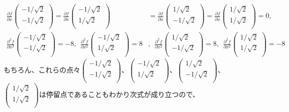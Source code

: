 \documentclass[dvipdfmx]{jsarticle}
\begin{document}
\begin{align*}
\frac{\partial f}{\partial x}\begin{pmatrix}
 - {1}/{\sqrt{2}} \\
 - {1}/{\sqrt{2}} \\
\end{pmatrix} = \frac{\partial f}{\partial x}\begin{pmatrix}
 - {1}/{\sqrt{2}} \\
{1}/{\sqrt{2}} \\
\end{pmatrix} &= \frac{\partial f}{\partial x}\begin{pmatrix}
{1}/{\sqrt{2}} \\
 - {1}/{\sqrt{2}} \\
\end{pmatrix} = \frac{\partial f}{\partial x}\begin{pmatrix}
{1}/{\sqrt{2}} \\
{1}/{\sqrt{2}} \\
\end{pmatrix} = 0,\\
\frac{\partial^{2}f}{\partial x^{2}}\begin{pmatrix}
 - {1}/{\sqrt{2}} \\
 - {1}/{\sqrt{2}} \\
\end{pmatrix} = - 8,\ \ \frac{\partial^{2}f}{\partial x^{2}}\begin{pmatrix}
 - {1}/{\sqrt{2}} \\
{1}/{\sqrt{2}} \\
\end{pmatrix} = 8&,\ \ \frac{\partial^{2}f}{\partial x^{2}}\begin{pmatrix}
{1}/{\sqrt{2}} \\
 - {1}/{\sqrt{2}} \\
\end{pmatrix} = 8,\ \ \frac{\partial^{2}f}{\partial x^{2}}\begin{pmatrix}
{1}/{\sqrt{2}} \\
{1}/{\sqrt{2}} \\
\end{pmatrix} = - 8
\end{align*}
もちろん、これらの点々$\begin{pmatrix}
 - {1}/{\sqrt{2}} \\
 - {1}/{\sqrt{2}} \\
\end{pmatrix}$、$\begin{pmatrix}
 - {1}/{\sqrt{2}} \\
{1}/{\sqrt{2}} \\
\end{pmatrix}$、$\begin{pmatrix}
{1}/{\sqrt{2}} \\
 - {1}/{\sqrt{2}} \\
\end{pmatrix}$、$\begin{pmatrix}
{1}/{\sqrt{2}} \\
{1}/{\sqrt{2}} \\
\end{pmatrix}$は停留点であることもわかり次式が成り立つので、
\end{document}
